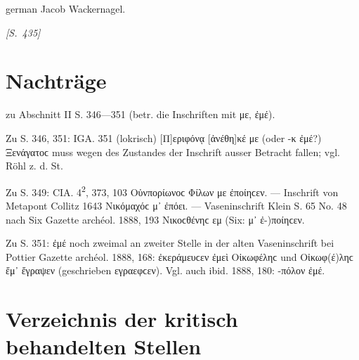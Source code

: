 \begin{otherlanguage*}{german}
\hfill Jacob Wackernagel. \hspace{1ex}

\hypertarget{p435}{\emph{[S.~435]}}\label{p435}

\section*{Nachträge}

zu Abschnitt II S. 346—351 (betr. die Inschriften mit με, ἐμέ).

Zu S. 346, 351: IGA. 351 (lokrisch) [Π]εριφόνᾳ [ἀνέθη]κέ με (oder -κ ἐμέ?) Ξενάγατοϲ muss wegen des Zustandes der Inschrift ausser Betracht fallen; vgl. Röhl z. d. St.

Zu S. 349: CIA. 4\textsuperscript{2}, 373, 103 Οὑνπορίωνοϲ Φίλων με ἐποίηϲεν. — Inschrift von Metapont Collitz 1643 Νικόμαχόϲ μ᾽ ἐπόει. — Vaseninschrift Klein S. 65 No. 48 nach Six Gazette archéol. 1888, 193 Νικοϲθένηϲ εμ (Six: μ᾽ ἐ-)ποίηϲεν.

Zu S. 351: ἐμέ noch zweimal an zweiter Stelle in der alten Vaseninschrift bei Pottier Gazette archéol. 1888, 168: ἐκεράμευϲεν ἐμεὶ Οἰκωφέληϲ und Οἰκωφ(έ)ληϲ ἔμ᾽ ἔγραψεν (geschrieben εγραεφϲεν). Vgl. auch ibid. 1888, 180: -πόλον ἐμέ.

\section*{Verzeichnis der kritisch behandelten Stellen}


\end{otherlanguage*}
